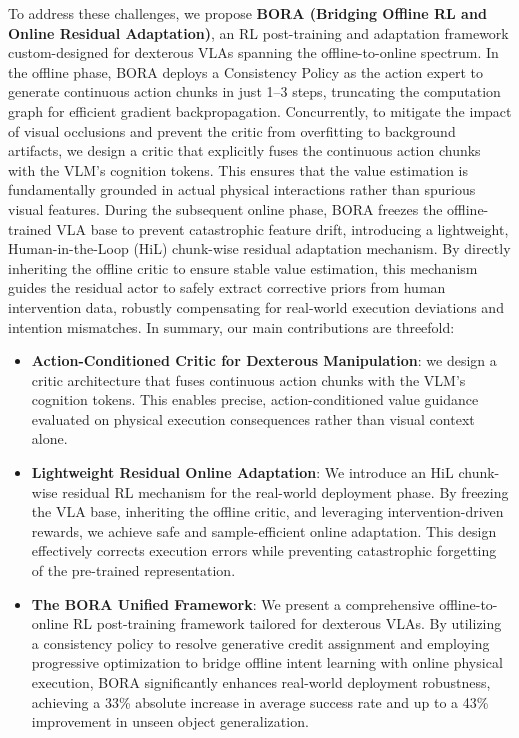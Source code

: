 \documentclass{article}
\begin{document}
To address these challenges, we propose \textbf{BORA (Bridging Offline RL and Online Residual Adaptation)}, an RL post-training and adaptation framework custom-designed for dexterous VLAs spanning the offline-to-online spectrum. In the offline phase, BORA deploys a Consistency Policy \cite{prasad2024consistency,lu2024manicm} as the action expert to generate continuous action chunks in just 1--3 steps, truncating the computation graph for efficient gradient backpropagation. Concurrently, to mitigate the impact of visual occlusions and prevent the critic from overfitting to background artifacts, we design a critic that explicitly fuses the continuous action chunks with the VLM's cognition tokens. This ensures that the value estimation is fundamentally grounded in actual physical interactions rather than spurious visual features. During the subsequent online phase, BORA freezes the offline-trained VLA base to prevent catastrophic feature drift, introducing a lightweight, Human-in-the-Loop (HiL) chunk-wise residual adaptation mechanism. By directly inheriting the offline critic to ensure stable value estimation, this mechanism guides the residual actor to safely extract corrective priors from human intervention data, robustly compensating for real-world execution deviations and intention mismatches.
In summary, our main contributions are threefold:
\begin{itemize}[nosep, leftmargin=*]
\item \textbf{Action-Conditioned Critic for Dexterous Manipulation}: we design a critic architecture that fuses continuous action chunks with the VLM's cognition tokens. This enables precise, action-conditioned value guidance evaluated on physical execution consequences rather than visual context alone.
\item \textbf{Lightweight Residual Online Adaptation}: We introduce an HiL chunk-wise residual RL mechanism for the real-world deployment phase. By freezing the VLA base, inheriting the offline critic, and leveraging intervention-driven rewards, we achieve safe and sample-efficient online adaptation. This design effectively corrects execution errors while preventing catastrophic forgetting of the pre-trained representation.
\item \textbf{The BORA Unified Framework}: We present a comprehensive offline-to-online RL post-training framework tailored for dexterous VLAs. By utilizing a consistency policy to resolve generative credit assignment and employing progressive optimization to bridge offline intent learning with online physical execution, BORA significantly enhances real-world deployment robustness, achieving a 33\% absolute increase in average success rate and up to a 43\% improvement in unseen object generalization.
\end{itemize}
\end{document}
